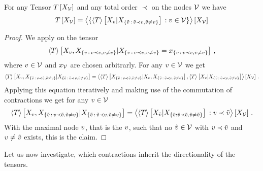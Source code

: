 \begin{theorem}\label{the:genericChainRule}
	For any Tensor $T\left[X_{\mathcal{V}}\right]$ and any total order $\prec$ on the nodes $\mathcal{V}$ we have %
	\begin{align*}
		T\left[X_{\mathcal{V}}\right] =
		\left\langle 
			\{ \left\langle T\right\rangle \left[ X_{v} | X_{\{\tilde{v} \, : \, \tilde{v} \prec v, \tilde{v}\neq v\}} \right]  \, : v\in\mathcal{V} \}
		\right\rangle \left[ X_{\mathcal{V}} \right]
	\end{align*}
\end{theorem}
\begin{proof}
	We apply  on the tensor
	\begin{align*}
		\left\langle T\right\rangle \left[ 
			X_{v},X_{\{\tilde{v} \, : \, v \prec \tilde{v}, \tilde{v}\neq v\}}
		 | 
			X_{\{\tilde{v} \, : \, \tilde{v} \prec v, \tilde{v}\neq v\}}=x_{\{\tilde{v} \, : \, \tilde{v} \prec v, \tilde{v}\neq v\}}
		 \right] \, ,
	\end{align*}
	where $v\in\mathcal{V}$ and $x_{\mathcal{V}}$ are chosen arbitrarly.
	For any $v\in\mathcal{V}$ we get
	\begin{align*}
		\left\langle T\right\rangle \left[ 
			X_{v},X_{\{\tilde{v} \, : \, v \prec \tilde{v}, \tilde{v}\neq v\}}
			 | 
			X_{\{\tilde{v} \, : \, \tilde{v} \prec v, \tilde{v}\neq v\}}
		 \right]
		= \left\langle 
			\left\langle T\right\rangle \left[ 
				X_{\{\tilde{v} \, : \, v \prec \tilde{v}, \tilde{v}\neq v\}}
				 | 
				X_{v},X_{\{\tilde{v} \, : \, \tilde{v} \prec v, \tilde{v}\neq v\}}
				 \right],
			\left\langle T\right\rangle \left[ 
				X_{v}
				 | 
				X_{\{\tilde{v} \, : \, \tilde{v} \prec v, \tilde{v}\neq v\}}
				 \right]
		\right\rangle \left[ 
			X_{\mathcal{V}}
		 \right] \, .
	\end{align*}
	Applying this equation iteratively and making use of the commutation of contractions we get for any $v\in\mathcal{V}$
	\begin{align*}
		\left\langle T\right\rangle \left[ 
			X_{v},X_{\{\tilde{v} \, : \, v \prec \tilde{v}, \tilde{v}\neq v\}}
		 | 
			X_{\{\tilde{v} \, : \, \tilde{v} \prec v, \tilde{v}\neq v\}}
		 \right]
		= \left\langle 
			\left\langle T\right\rangle \left[ 
				X_{\tilde{v}}
			 | 
				X_{\{\bar{v} : \bar{v} \prec \tilde{v}, \bar{v}\neq\tilde{v}\}}
			 \right]
			\, : v \prec \tilde{v}
		\right\rangle \left[ 
			X_{\mathcal{V}}
		 \right] \, .
	\end{align*}
	With the maximal node $v$, that is the $v$, such that no $\tilde{v}\in\mathcal{V}$ with $v\prec\tilde{v}$ and $v\neq\tilde{v}$ exists, this is the claim.
\end{proof}



Let us now investigate, which contractions inherit the directionality of the tensors.

